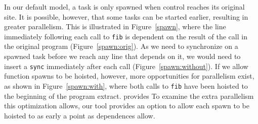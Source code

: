 In our default model, a task is only spawned when control reaches its original site.
It is possible, however, that some tasks can be started earlier, resulting in greater parallelism.
This is illustrated in Figure~\ref{spawn}, where the line immediately following each call to \texttt{fib} is dependent on the result of the call in the original program (Figure~\ref{spawn:orig}).
As we need to synchronize on a spawned task before we reach any line that depends on it, we would need to insert a \texttt{sync} immediately after each call (Figure~\ref{spawn:without}).
If we allow function spawns to be hoisted, however, more opportunities for parallelism exist, as shown in Figure~\ref{spawn:with}, where both calls to \texttt{fib} have been hoisted to the beginning of the program extract.
provides To examine the extra parallelism this optimization allows, our tool provides an option to allow each spawn to be hoisted to as early a point as dependences allow.

